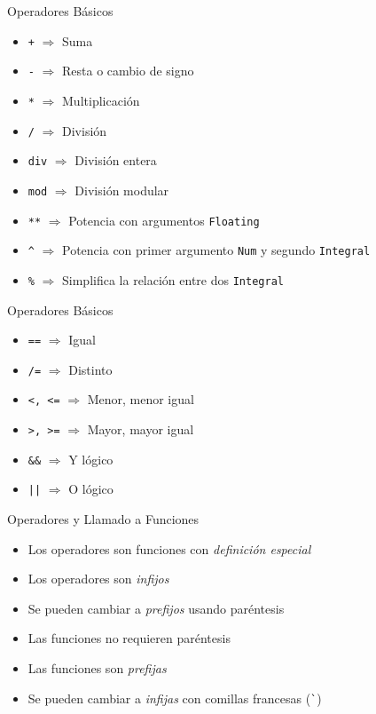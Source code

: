 \begin{frame}[fragile]{Operadores Básicos}
    \begin{itemize}
        \item \verb|+| $\Rightarrow$ Suma
        \item \verb|-| $\Rightarrow$ Resta o cambio de signo
        \item \verb|*| $\Rightarrow$ Multiplicación
        \item \verb|/| $\Rightarrow$ División
        \item \verb|div| $\Rightarrow$ División entera
        \item \verb|mod| $\Rightarrow$ División modular
        \item \verb|**| $\Rightarrow$ Potencia con argumentos \verb|Floating|
        \item \verb|^| $\Rightarrow$ Potencia con primer argumento \verb|Num| y segundo \verb|Integral|
        \item \verb|%| $\Rightarrow$ Simplifica la relación entre dos \verb|Integral|
    \end{itemize}
\end{frame}

\begin{frame}[fragile]{Operadores Básicos}
    \begin{itemize}
        \item \verb|==| $\Rightarrow$ Igual
        \item \verb|/=| $\Rightarrow$ Distinto
        \item \verb|<, <=| $\Rightarrow$ Menor, menor igual
        \item \verb|>, >=| $\Rightarrow$ Mayor, mayor igual
        \item \verb|&&| $\Rightarrow$ Y lógico
        \item \verb_||_ $\Rightarrow$ O lógico
    \end{itemize}
\end{frame}

\begin{frame}[fragile]{Operadores y Llamado a Funciones}
    \begin{itemize}
        \item Los operadores son funciones con \emph{definición especial}
        \item Los operadores son \emph{infijos}
        \item Se pueden cambiar a \emph{prefijos} usando paréntesis
        \item Las funciones no requieren paréntesis
        \item Las funciones son \emph{prefijas}
        \item Se pueden cambiar a \emph{infijas} con comillas francesas (\verb|`|)
    \end{itemize}
\end{frame}

